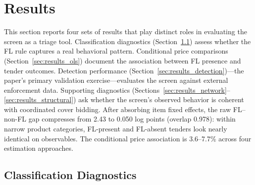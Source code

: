 
\section{Results}
\label{sec:results}

This section reports four sets of results that play distinct roles
in evaluating the screen as a triage tool.
Classification diagnostics (Section~\ref{sec:class_diagnostics})
assess whether the FL rule captures a real behavioral pattern.
Conditional price comparisons
(Section~\ref{sec:results_ols}) document the association between FL
presence and tender outcomes. Detection performance
(Section~\ref{sec:results_detection})---the paper's primary
validation exercise---evaluates the screen against
external enforcement data. Supporting diagnostics
(Sections~\ref{sec:results_network}--\ref{sec:results_structural})
ask whether the screen's observed behavior is coherent with
coordinated cover bidding. After absorbing item fixed effects, the
raw FL--non-FL gap compresses from 2.43 to 0.050 log points (overlap
0.978): within narrow product categories, FL-present and FL-absent
tenders look nearly identical on observables. The conditional price
association is 3.6--7.7\% across four estimation approaches.


\subsection{Classification Diagnostics}
\label{sec:class_diagnostics}


